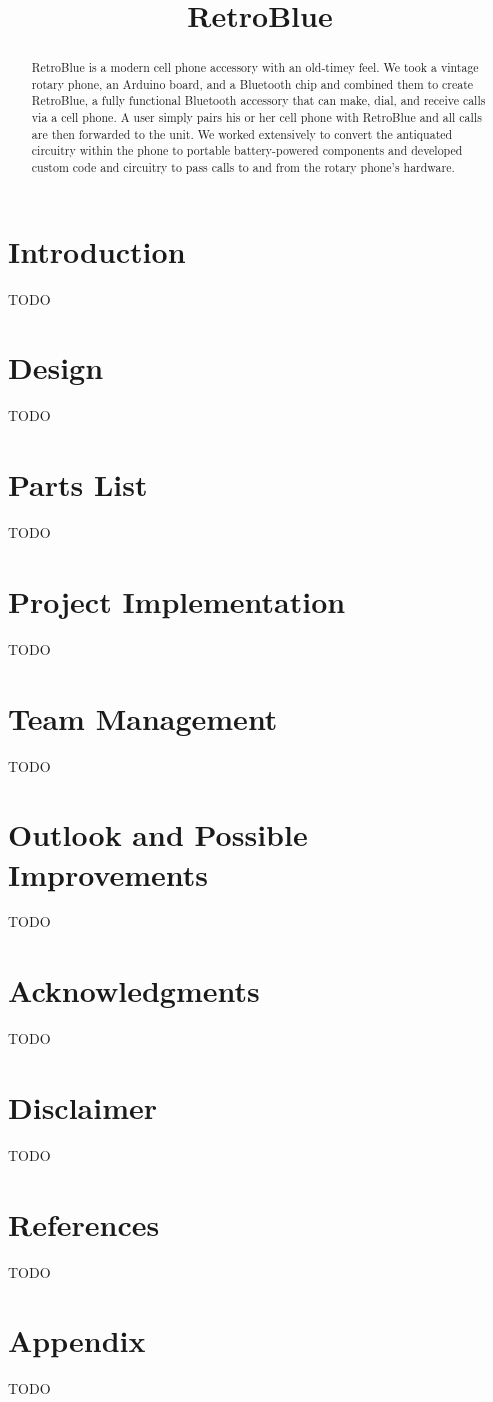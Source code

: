\documentclass{es50report}
\title{RetroBlue}
\begin{document}
    \maketitlepage

    \begin{abstract}
        RetroBlue is a modern cell phone accessory with an old-timey feel. We took a vintage rotary phone, an Arduino board, and a Bluetooth chip and combined them to create RetroBlue, a fully functional Bluetooth accessory that can make, dial, and receive calls via a cell phone. A user simply pairs his or her cell phone with RetroBlue and all calls are then forwarded to the unit. We worked extensively to convert the antiquated circuitry within the phone to portable battery-powered components and developed custom code and circuitry to pass calls to and from the rotary phone's hardware.
    \end{abstract}
    \newpage

    \section{Introduction}
    TODO

    \section{Design}
    TODO

    \section{Parts List}
    TODO

    \section{Project Implementation}
    TODO

    \section{Team Management}
    TODO

    \section{Outlook and Possible Improvements}
    TODO

    \section{Acknowledgments}
    TODO

    \section{Disclaimer}
    TODO

    \section{References}
    TODO

    \appendix
    \section{Appendix}
    TODO
\end{document}
